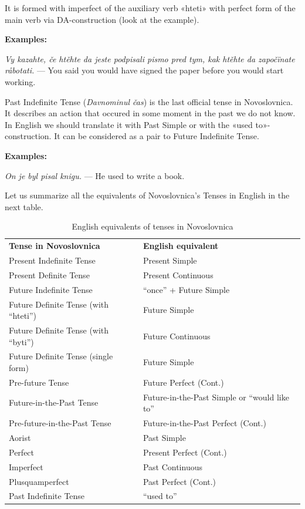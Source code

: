 It is formed with imperfect of the auxiliary verb «hteti» with perfect form of the main verb via DA-construction (look at the example).

\textbf{Examples:}

\textit{Vy kazahte, če htěhte da jeste podpisali pismo pred tym, kak htěhte da započïnate råbotati.} — You said you would have signed the paper before you would start working.

Past Indefinite Tense (\textit{Davnominul čas}) is the last official tense in Novoslovnica. It describes an action that occured in some moment in the past we do not know. In English we should translate it with Past Simple or with the «used to»-construction. It can be considered as a pair to Future Indefinite Tense.

\textbf{Examples:}

\textit{On je byl pisal knigu.} — He used to write a book.

Let us summarize all the equivalents of Novoslovnica's Tenses in English in the next table.

\begin{table}
	\caption{English equivalents of tenses in Novoslovnica}
	\begin{tabular}{ p{11em} p{11em} }
		\textbf{Tense in Novoslovnica}       & \textbf{English equivalent}                  \\
		Present Indefinite Tense             & Present Simple                               \\
		Present Definite Tense               & Present Continuous                           \\
		Future Indefinite Tense              & “once” + Future Simple                       \\
		Future Definite Tense (with “hteti”) & Future Simple                                \\
		Future Definite Tense (with “byti”)  & Future Continuous                            \\
		Future Definite Tense (single form)  & Future Simple                                \\
		Pre-future Tense                     & Future Perfect (Cont.)                       \\
		Future-in-the-Past Tense             & Future-in-the-Past Simple or “would like to” \\
		Pre-future-in-the-Past Tense         & Future-in-the-Past Perfect (Cont.)           \\
		Aorist                               & Past Simple                                  \\
		Perfect                              & Present Perfect (Cont.)                      \\
		Imperfect                            & Past Continuous                              \\
		Plusquamperfect                      & Past Perfect (Cont.)                         \\
		Past Indefinite Tense                & “used to”                                    
	\end{tabular}
\end{table}


